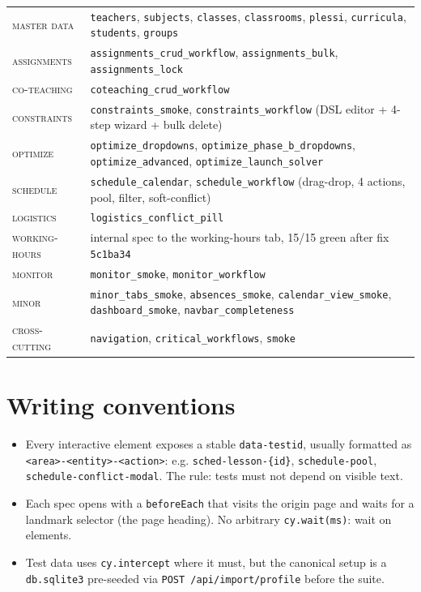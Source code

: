 \begin{statsbox}[title={Cypress suite map (May MMXXVI)}]
\begin{tabular}{ll}
  \textsc{master data} &
    \texttt{teachers}, \texttt{subjects}, \texttt{classes},
    \texttt{classrooms}, \texttt{plessi}, \texttt{curricula},
    \texttt{students}, \texttt{groups} \\
  \textsc{assignments} &
    \texttt{assignments\_crud\_workflow},
    \texttt{assignments\_bulk}, \texttt{assignments\_lock} \\
  \textsc{co-teaching} & \texttt{coteaching\_crud\_workflow} \\
  \textsc{constraints} &
    \texttt{constraints\_smoke}, \texttt{constraints\_workflow}
    (DSL editor + 4-step wizard + bulk delete) \\
  \textsc{optimize} &
    \texttt{optimize\_dropdowns},
    \texttt{optimize\_phase\_b\_dropdowns},
    \texttt{optimize\_advanced},
    \texttt{optimize\_launch\_solver} \\
  \textsc{schedule} &
    \texttt{schedule\_calendar},
    \texttt{schedule\_workflow}
    (drag-drop, 4 actions, pool, filter, soft-conflict) \\
  \textsc{logistics} &
    \texttt{logistics\_conflict\_pill} \\
  \textsc{working-hours} &
    internal spec to the working-hours tab, 15/15 green after
    fix \texttt{5c1ba34} \\
  \textsc{monitor} & \texttt{monitor\_smoke},
    \texttt{monitor\_workflow} \\
  \textsc{minor} &
    \texttt{minor\_tabs\_smoke}, \texttt{absences\_smoke},
    \texttt{calendar\_view\_smoke}, \texttt{dashboard\_smoke},
    \texttt{navbar\_completeness} \\
  \textsc{cross-cutting} &
    \texttt{navigation}, \texttt{critical\_workflows},
    \texttt{smoke} \\
\end{tabular}
\end{statsbox}

\section{Writing conventions}

\begin{itemize}
  \item Every interactive element exposes a stable
    \texttt{data-testid}, usually formatted as
    \texttt{<area>-<entity>-<action>}: e.g.
    \texttt{sched-lesson-\{id\}}, \texttt{schedule-pool},
    \texttt{schedule-conflict-modal}. The rule: tests must not
    depend on visible text.
  \item Each spec opens with a \texttt{beforeEach} that visits
    the origin page and waits for a landmark selector (the page
    heading). No arbitrary \texttt{cy.wait(ms)}: wait on
    elements.
  \item Test data uses \texttt{cy.intercept} where it must, but
    the canonical setup is a \texttt{db.sqlite3} pre-seeded via
    \texttt{POST /api/import/profile} before the suite.
\end{itemize}

